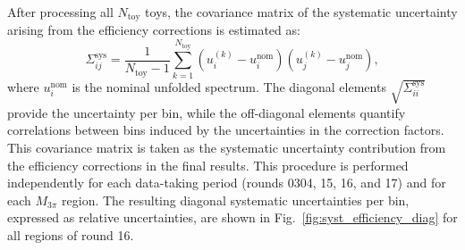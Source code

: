 After processing all $N_{\text{toy}}$ toys, the covariance matrix of the systematic uncertainty arising from the efficiency corrections is estimated as:
\[
\Sigma_{ij}^{\text{sys}} = \frac{1}{N_{\text{toy}} - 1} \sum_{k=1}^{N_{\text{toy}}} \left( u_i^{(k)} - u_i^{\text{nom}} \right) \left( u_j^{(k)} - u_j^{\text{nom}} \right),
\]
where $u_i^{\text{nom}}$ is the nominal unfolded spectrum. The diagonal elements $\sqrt{\Sigma_{ii}^{\text{sys}}}$ provide the uncertainty per bin, while the off-diagonal elements quantify correlations between bins induced by the uncertainties in the correction factors. This covariance matrix is taken as the systematic uncertainty contribution from the efficiency corrections in the final results. This procedure is performed independently for each data-taking period (rounds 0304, 15, 16, and 17) and for each $M_{3\pi}$ region. The resulting diagonal systematic uncertainties per bin, expressed as relative uncertainties, are shown in Fig.~\ref{fig:syst_efficiency_diag} for all regions of round 16.


